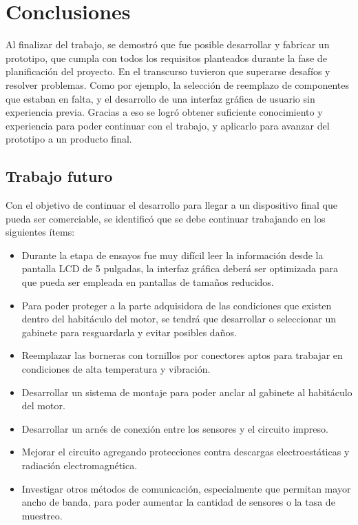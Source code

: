 \chapter{Conclusiones}

\label{Chapter5}

Al finalizar del trabajo, se demostró que fue posible desarrollar y fabricar un prototipo, que cumpla con todos los requisitos planteados durante la fase de planificación del proyecto. En el transcurso tuvieron que superarse desafíos y resolver problemas. Como por ejemplo, la selección de reemplazo de componentes que estaban en falta, y el desarrollo de una interfaz gráfica de usuario sin experiencia previa. Gracias a eso se logró obtener suficiente conocimiento y experiencia para poder continuar con el trabajo, y aplicarlo para avanzar del prototipo a un producto final.

\section{Trabajo futuro}
Con el objetivo de continuar el desarrollo para llegar a un dispositivo final que pueda ser comerciable, se identificó que se debe continuar trabajando en los siguientes ítems:

\begin{itemize}
\item Durante la etapa de ensayos fue muy difícil leer la información desde la pantalla LCD de 5 pulgadas, la interfaz gráfica deberá ser optimizada para que pueda ser empleada en pantallas de tamaños reducidos.

\item Para poder proteger a la parte adquisidora de las condiciones que existen dentro del habitáculo del motor, se tendrá que desarrollar o seleccionar un gabinete para resguardarla y evitar posibles daños.

\item Reemplazar las borneras con tornillos por conectores aptos para trabajar en condiciones de alta temperatura y vibración.

\item Desarrollar un sistema de montaje para poder anclar al gabinete al habitáculo del motor.

\item Desarrollar un arnés de conexión entre los sensores y el circuito impreso.

\item Mejorar el circuito agregando protecciones contra descargas electroestáticas y radiación electromagnética.

\item Investigar otros métodos de comunicación, especialmente que permitan mayor ancho de banda, para poder aumentar la cantidad de sensores o la tasa de muestreo.

\end{itemize}



